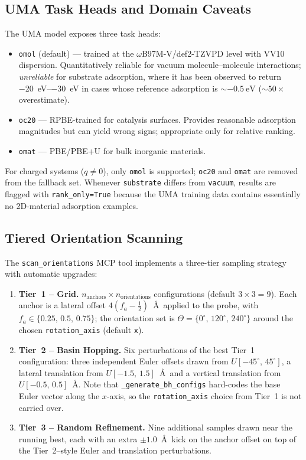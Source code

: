 \subsection{UMA Task Heads and Domain Caveats}
\label{sec:tasks}

The UMA model exposes three task heads:

\begin{itemize}
\item \texttt{omol} (default) --- trained at the
  $\omega$B97M-V/def2-TZVPD level with VV10 dispersion. Quantitatively
  reliable for vacuum molecule--molecule interactions; \emph{unreliable}
  for substrate adsorption, where it has been observed to return
  \SIrange{-20}{-30}{\eV} in cases whose reference adsorption is
  $\sim\!\SI{-0.5}{\eV}$ ($\sim 50\times$ overestimate).
\item \texttt{oc20} --- RPBE-trained for catalysis surfaces. Provides
  reasonable adsorption magnitudes but can yield wrong signs;
  appropriate only for relative ranking.
\item \texttt{omat} --- PBE/PBE+U for bulk inorganic materials.
\end{itemize}

For charged systems ($q \neq 0$), only \texttt{omol} is supported;
\texttt{oc20} and \texttt{omat} are removed from the fallback set.
Whenever \texttt{substrate} differs from \texttt{vacuum}, results are
flagged with \texttt{rank\_only=True} because the UMA training data
contains essentially no 2D-material adsorption examples.

\subsection{Tiered Orientation Scanning}
\label{sec:scan}

The \texttt{scan\_orientations} MCP tool implements a three-tier
sampling strategy with automatic upgrades:

\begin{enumerate}
\item \textbf{Tier~1 -- Grid.} $n_{\text{anchors}} \times
  n_{\text{orientations}}$ configurations (default $3 \times 3 = 9$).
  Each anchor is a lateral offset $4(f_a - \tfrac12)$~\AA\ applied to
  the probe, with $f_a \in \{0.25,\,0.5,\,0.75\}$; the orientation set
  is $\Theta=\{0^\circ,\,120^\circ,\,240^\circ\}$ around the chosen
  \texttt{rotation\_axis} (default \texttt{x}).
\item \textbf{Tier~2 -- Basin Hopping.} Six perturbations of the
  best Tier~1 configuration: three independent Euler offsets drawn
  from $U[-45^\circ,\,45^\circ]$, a lateral translation from
  $U[-1.5,\,1.5]$~\AA\ and a vertical translation from
  $U[-0.5,\,0.5]$~\AA. Note that \texttt{\_generate\_bh\_configs}
  hard-codes the base Euler vector along the $x$-axis, so the
  \texttt{rotation\_axis} choice from Tier~1 is not carried over.
\item \textbf{Tier~3 -- Random Refinement.} Nine additional samples
  drawn near the running best, each with an extra $\pm1.0$~\AA\ kick
  on the anchor offset on top of the Tier~2--style Euler and
  translation perturbations.
\end{enumerate}

